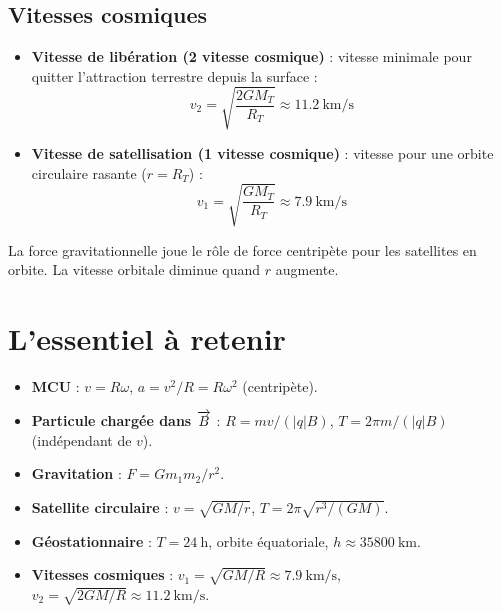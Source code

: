 \subsection{Vitesses cosmiques}

\begin{propriete}
\begin{itemize}
\item \textbf{Vitesse de libération (2 vitesse cosmique)} : vitesse minimale pour quitter l'attraction terrestre depuis la surface :
\[
v_2 = \sqrt{\frac{2GM_T}{R_T}} \approx \SI{11.2}{\kilo\metre\per\second}
\]
\item \textbf{Vitesse de satellisation (1 vitesse cosmique)} : vitesse pour une orbite circulaire rasante ($r=R_T$) :
\[
v_1 = \sqrt{\frac{GM_T}{R_T}} \approx \SI{7.9}{\kilo\metre\per\second}
\]
\end{itemize}
\end{propriete}

\begin{aretenir}
La force gravitationnelle joue le rôle de force centripète pour les satellites en orbite. La vitesse orbitale diminue quand $r$ augmente.
\end{aretenir}

\section{L'essentiel à retenir}

\begin{synthese}
\begin{itemize}
\item \textbf{MCU} : $v = R\omega$, $a = v^2/R = R\omega^2$ (centripète).
\item \textbf{Particule chargée dans $\overrightarrow{B}$} : $R = mv/(|q|B)$, $T = 2\pi m/(|q|B)$ (indépendant de $v$).
\item \textbf{Gravitation} : $F = G m_1 m_2 / r^2$.
\item \textbf{Satellite circulaire} : $v = \sqrt{GM/r}$, $T = 2\pi\sqrt{r^3/(GM)}$.
\item \textbf{Géostationnaire} : $T = \SI{24}{\hour}$, orbite équatoriale, $h \approx \SI{35800}{\kilo\metre}$.
\item \textbf{Vitesses cosmiques} : $v_1 = \sqrt{GM/R} \approx \SI{7.9}{\kilo\metre\per\second}$, $v_2 = \sqrt{2GM/R} \approx \SI{11.2}{\kilo\metre\per\second}$.
\end{itemize}
\end{synthese}

